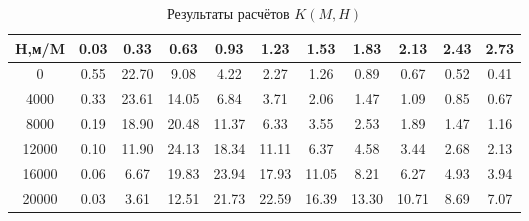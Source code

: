 \begin{table}[H]
\centering
\caption{Результаты расчётов $K(M,H)$}
\label{K}
\begin{tabular}{|c|c|c|c|c|c|c|c|c|c|c|}
\toprule
H,м/M &  0.03 &   0.33 &   0.63 &   0.93 &   1.23 &   1.53 &   1.83 &   2.13 &  2.43 &  2.73 \\
\midrule
0     &  0.55 &  22.70 &   9.08 &   4.22 &   2.27 &   1.26 &   0.89 &   0.67 &  0.52 &  0.41 \\
4000  &  0.33 &  23.61 &  14.05 &   6.84 &   3.71 &   2.06 &   1.47 &   1.09 &  0.85 &  0.67 \\
8000  &  0.19 &  18.90 &  20.48 &  11.37 &   6.33 &   3.55 &   2.53 &   1.89 &  1.47 &  1.16 \\
12000 &  0.10 &  11.90 &  24.13 &  18.34 &  11.11 &   6.37 &   4.58 &   3.44 &  2.68 &  2.13 \\
16000 &  0.06 &   6.67 &  19.83 &  23.94 &  17.93 &  11.05 &   8.21 &   6.27 &  4.93 &  3.94 \\
20000 &  0.03 &   3.61 &  12.51 &  21.73 &  22.59 &  16.39 &  13.30 &  10.71 &  8.69 &  7.07 \\
\bottomrule
\end{tabular}
\end{table}
